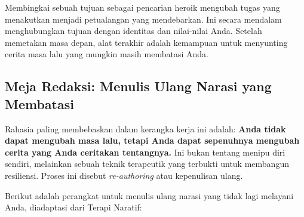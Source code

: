 \documentclass[
  letterpaper,
  DIV=11,
  numbers=noendperiod]{scrreprt}
\begin{document}
Membingkai sebuah tujuan sebagai pencarian heroik mengubah tugas yang
menakutkan menjadi petualangan yang mendebarkan. Ini secara mendalam
menghubungkan tujuan dengan identitas dan nilai-nilai Anda. Setelah
memetakan masa depan, alat terakhir adalah kemampuan untuk menyunting
cerita masa lalu yang mungkin masih membatasi Anda.

\subsection{Meja Redaksi: Menulis Ulang Narasi yang
Membatasi}\label{meja-redaksi-menulis-ulang-narasi-yang-membatasi}

Rahasia paling membebaskan dalam kerangka kerja ini adalah: \textbf{Anda
tidak dapat mengubah masa lalu, tetapi Anda dapat sepenuhnya mengubah
cerita yang Anda ceritakan tentangnya.} Ini bukan tentang menipu diri
sendiri, melainkan sebuah teknik terapeutik yang terbukti untuk
membangun resiliensi. Proses ini disebut \emph{re-authoring} atau
kepenulisan ulang.

Berikut adalah perangkat untuk menulis ulang narasi yang tidak lagi
melayani Anda, diadaptasi dari Terapi Naratif:
\end{document}
